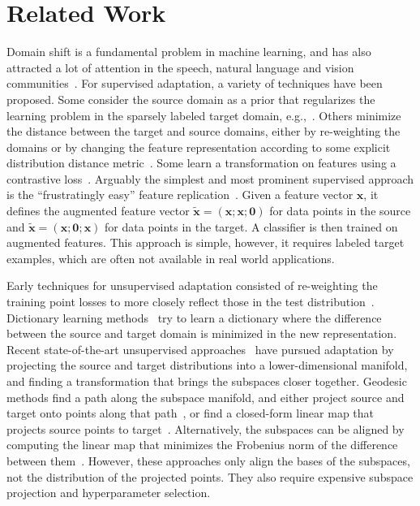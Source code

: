 \documentclass[letterpaper]{article}
\begin{document}
\section{Related Work}
\label{sec:related}

Domain shift is a fundamental problem in machine learning, and has also attracted a lot of attention in the speech, natural language and vision communities~\cite{Blitzer07Biographies,gopalan-iccv11,bmvc}.
For supervised adaptation, a variety of techniques have been proposed. Some consider the source domain as a prior that regularizes the learning problem in the sparsely labeled target domain, e.g.,~\cite{yang_icdm07}. Others minimize the distance between the target and source domains, either by re-weighting the domains or by changing the feature representation according to some explicit distribution distance metric~\cite{mmd}. Some learn a transformation on features using a contrastive loss~\cite{saenko2010adapting}.
Arguably the simplest and most prominent supervised approach is the ``frustratingly easy'' feature replication~\cite{daume}.
Given a feature vector $\bm{x}$, it defines the augmented feature vector $\tilde{\bm{x}} = (\bm{x}; \bm{x}; \bm{0})$ for data points in the source and $\tilde{\bm{x}} = (\bm{x}; \bm{0}; \bm{x})$ for data points in the target. A classifier is then trained on augmented features. This approach is simple, however, it requires labeled target examples, which are often not available in real world applications.

Early techniques for unsupervised adaptation consisted of re-weighting the training point losses to more closely reflect those in the test distribution~\cite{jiang-zhai07,huang_nips06}. Dictionary learning methods~\cite{dict_1,dict_2} try to learn a dictionary where the difference between the source and target domain is minimized in the new representation.
Recent state-of-the-art unsupervised approaches~\cite{gopalan-iccv11,gfk,long_cvpr,Sp_CVPR15} have pursued adaptation by projecting the source and target distributions into a lower-dimensional manifold, and finding a transformation that brings the subspaces closer together. Geodesic methods find a path along the subspace manifold, and either project source and target onto points along that path~\cite{gopalan-iccv11}, or find a closed-form linear map that projects source points to target~\cite{gfk}. Alternatively, the subspaces can be aligned by computing the linear map that minimizes the Frobenius norm of the difference between them~\cite{outlooks,sasb}. However, these approaches only align the bases of the subspaces, not the distribution of the projected points. They also require expensive subspace projection and hyperparameter selection.
\end{document}
